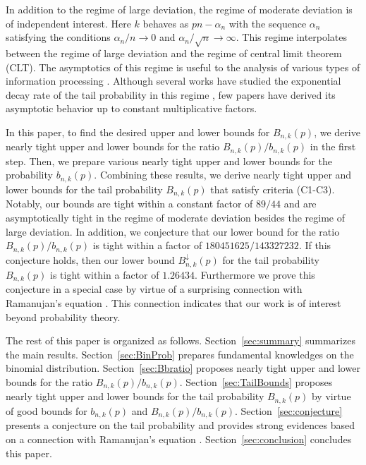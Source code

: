 \documentclass[aop]{imsart}
\theoremstyle{plain}
\theoremstyle{remark}
\newcommand{\1}{\operatorname{\uppercase\expandafter{\romannumeral1}}}
\newcommand{\2}{\operatorname{\uppercase\expandafter{\romannumeral2}}}
\newcommand{\3}{\operatorname{\uppercase\expandafter{\romannumeral3}}}
\newcommand{\4}{\operatorname{\uppercase\expandafter{\romannumeral4}}}
\newcommand{\5}{\operatorname{\uppercase\expandafter{\romannumeral5}}}
\newcommand{\6}{\operatorname{\uppercase\expandafter{\romannumeral6}}}
\newcommand{\7}{\operatorname{\uppercase\expandafter{\romannumeral7}}}
\newcommand{\8}{\operatorname{\uppercase\expandafter{\romannumeral8}}}
\newcommand{\9}{\operatorname{\uppercase\expandafter{\romannumeral9}}}
\newcommand{\Sref}[1]{Section~\ref{#1}}
\begin{document}
	In addition to the regime of large deviation, 	the regime of moderate deviation \cite{Wu95,Acos97,DembZ10,WataH17} is of independent interest. 
Here $k$ behaves as 
	$pn -\alpha_n$ with the  sequence $\alpha_n$ satisfying the conditions 
	$ \alpha_n/n \to 0$ and $\alpha_n/\sqrt{n}\to \infty$. This regime interpolates between the regime of large deviation  and the regime of central limit theorem (CLT). 	
The asymptotics of this regime is useful to the analysis of various types of information processing \cite{AltuW14,PolyV10,Tan12,HayaW16,HayaW20,ChubTT17,ChenH18}. Although several works have studied the exponential decay rate of the tail probability in this regime \cite{Wu95,Acos97,DembZ10,WataH17}, few papers have derived its asymptotic behavior up to  constant multiplicative factors.
	


In this paper, to find the desired upper and lower bounds for 
$B_{n,k}(p)$,
we derive nearly tight  upper and lower bounds for 
the ratio $B_{n,k}(p)/b_{n,k}(p)$ in the first step. 
Then, we prepare various 
nearly tight  upper and lower bounds for the probability $b_{n,k}(p)$.
Combining these results, we derive 
nearly tight  upper and lower bounds for 
the tail probability $B_{n,k}(p)$ that satisfy criteria (C1-C3). Notably, our bounds are tight within a constant factor of $89/44$ and are  asymptotically tight in the regime of moderate deviation besides the regime of large deviation.  In addition, we conjecture that our lower bound for the ratio $B_{n,k}(p)/b_{n,k}(p)$ is tight within a factor of $180451625/143327232$. If this conjecture holds, then our lower bound $B_{n,k}^\downarrow(p)$ for the tail probability $B_{n,k}(p)$  is tight within a factor of $1.26434$. Furthermore
we prove this conjecture in a special case by virtue of a surprising connection with Ramanujan's equation \cite{Rama27,JogdS68}. This connection  indicates that our work is of interest beyond probability theory. 


 

The rest of this paper is organized as follows.
\Sref{sec:summary} summarizes the main results.
\Sref{sec:BinProb} prepares fundamental knowledges on the binomial distribution.
\Sref{sec:Bbratio} 
proposes nearly tight  upper and lower bounds for 
the ratio $B_{n,k}(p)/b_{n,k}(p)$.
\Sref{sec:TailBounds} 
proposes nearly tight  upper and lower bounds for 
the tail probability $B_{n,k}(p)$ 
by virtue of good bounds for $b_{n,k}(p)$ and $B_{n,k}(p)/b_{n,k}(p)$.
\Sref{sec:conjecture} 
presents a conjecture on 
the tail probability and provides strong evidences based on a  connection with Ramanujan's equation \cite{Rama27,JogdS68}.
 \Sref{sec:conclusion} concludes this paper.
 
\end{document}
